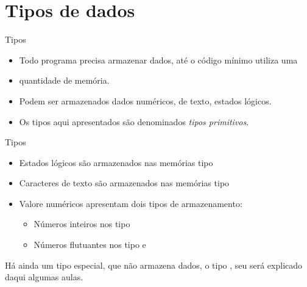 \documentclass[11pt]{beamer}
\subtitle{Tipo assim\dots}
\begin{document}
\titlepage

\begin{frame}
	\tableofcontents
\end{frame}

\section{Tipos de dados}
	\begin{frame}{Tipos}
		\begin{itemize}
			\presentationPause\item Todo programa precisa armazenar dados, até o código mínimo utiliza uma \presentationPause\item quantidade de memória.
			\presentationPause\item Podem ser armazenados dados numéricos, de texto, estados lógicos.
			\presentationPause\item Os tipos aqui apresentados são denominados \emph{tipos primitivos}.
		\end{itemize}
	\end{frame}\begin{frame}{Tipos}
		\begin{itemize}
			\presentationPause\item Estados lógicos são armazenados nas memórias tipo 
			\presentationPause\item Caracteres de texto são armazenados nas memórias tipo 
			\presentationPause\item Valore numéricos apresentam dois tipos de armazenamento:
			\begin{itemize}
				\presentationPause\item Números inteiros nos tipo 
				\presentationPause\item Números flutuantes nos tipo  e 
			\end{itemize}
		\end{itemize}
		\presentationPause Há ainda um tipo especial, que não armazena dados, o tipo , seu será explicado daqui algumas aulas.
	\end{frame}
\end{document}
